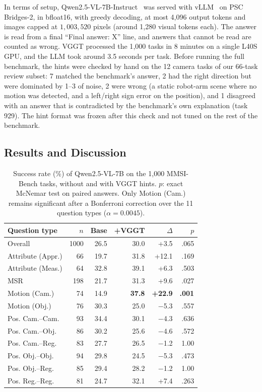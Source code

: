 In terms of setup, Qwen2.5-VL-7B-Instruct~\citep{bai2025qwen25vl} was served with vLLM~\citep{kwon2023vllm} on PSC Bridges-2, in bfloat16, with greedy decoding, at most 4{,}096 output tokens and images capped at $1{,}003{,}520$ pixels (around 1{,}280 visual tokens each). The answer is read from a final ``Final answer: X'' line, and answers that cannot be read are counted as wrong. VGGT processed the 1{,}000 tasks in 8 minutes on a single L40S GPU, and the LLM took around 3.5 seconds per task. Before running the full benchmark, the hints were checked by hand on the 12 camera tasks of our 66-task review subset: 7 matched the benchmark's answer, 2 had the right direction but were dominated by 1--3\textdegree{} of noise, 2 were wrong (a static robot-arm scene where no motion was detected, and a left/right sign error on the position), and 1 disagreed with an answer that is contradicted by the benchmark's own explanation (task 929). The hint format was frozen after this check and not tuned on the rest of the benchmark.

\subsection{Results and Discussion}
\label{sec:idea2-results}

\begin{table}[t]
\centering
\small
\caption{Success rate (\%) of Qwen2.5-VL-7B on the 1{,}000 MMSI-Bench tasks, without and with VGGT hints. $p$: exact McNemar test on paired answers. Only Motion (Cam.) remains significant after a Bonferroni correction over the 11 question types ($\alpha=0.0045$).}
\label{tab:idea2-main}
\begin{tabular}{lrrrrr}
\toprule
Question type & $n$ & Base & +VGGT & $\Delta$ & $p$ \\
\midrule
Overall            & 1000 & 26.5 & 30.0 & +3.5  & .065 \\
\midrule
Attribute (Appr.)  & 66   & 19.7 & 31.8 & +12.1 & .169 \\
Attribute (Meas.)  & 64   & 32.8 & 39.1 & +6.3  & .503 \\
MSR                & 198  & 21.7 & 31.3 & +9.6  & .027 \\
Motion (Cam.)      & 74   & 14.9 & \textbf{37.8} & \textbf{+22.9} & \textbf{.001} \\
Motion (Obj.)      & 76   & 30.3 & 25.0 & $-$5.3 & .557 \\
Pos. Cam.--Cam.    & 93   & 34.4 & 30.1 & $-$4.3 & .636 \\
Pos. Cam.--Obj.    & 86   & 30.2 & 25.6 & $-$4.6 & .572 \\
Pos. Cam.--Reg.    & 83   & 27.7 & 26.5 & $-$1.2 & 1.00 \\
Pos. Obj.--Obj.    & 94   & 29.8 & 24.5 & $-$5.3 & .473 \\
Pos. Obj.--Reg.    & 85   & 29.4 & 28.2 & $-$1.2 & 1.00 \\
Pos. Reg.--Reg.    & 81   & 24.7 & 32.1 & +7.4  & .263 \\
\bottomrule
\end{tabular}
\end{table}

